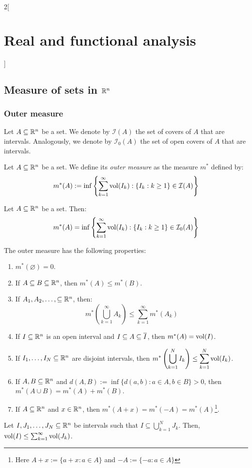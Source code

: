 \documentclass[../../../main.tex]{subfiles}
\begin{document}
\begin{multicols}{2}[\section{Real and functional analysis}]
  \subsection{Measure of sets in \texorpdfstring{$\mathbb{R}^n$}{Rn}}
  \subsubsection{Outer measure}
  \begin{definition}
    Let $A\subseteq\mathbb{R}^n$ be a set. We denote by $\mathcal{I}(A)$ the set of covers of $A$ that are intervals. Analogously, we denote by $\mathcal{I}_0(A)$ the set of open covers of $A$ that are intervals.
  \end{definition}
  \begin{definition}
    Let $A\subseteq\mathbb{R}^n$ be a set. We define its \emph{outer measure} as the measure $m^*$ defined by:
    $$m^*(A):=\inf\left\{\sum_{k= 1}^\infty \operatorname{vol}(I_k):\{I_k:k\geq 1\}\in \mathcal{I}(A)\right\}$$
  \end{definition}
  \begin{proposition}
    Let $A\subseteq\mathbb{R}^n$ be a set. Then:
    $$m^*(A)=\inf\left\{\sum_{k= 1}^\infty \operatorname{vol}(I_k):\{I_k:k\geq 1\}\in \mathcal{I}_0(A)\right\}$$
  \end{proposition}
  \begin{theorem}
    The outer measure has the following properties:
    \begin{enumerate}
      \item $m^*(\varnothing)=0$.
      \item If $A\subseteq B\subseteq\mathbb{R}^n$, then $m^*(A)\leq m^*(B)$.
      \item If $A_1, A_2,\ldots, \subseteq \mathbb{R}^n$, then: $$ m^*\left(\bigcup_{k=1}^\infty A_k\right)\leq \sum_{k=1}^\infty m^*(A_k)$$
      \item If $I\subseteq \mathbb{R}^n$ is an open interval and $I\subseteq A\subseteq \overline{I}$, then $m^*(A)=\operatorname{vol}(I)$.
      \item If $I_1,\ldots,I_N\subseteq \mathbb{R}^n$ are disjoint intervals, then $\displaystyle m^*\left(\bigcup_{k=1}^N I_k\right)\leq \sum_{k=1}^N \operatorname{vol}(I_k)$.
      \item If $A,B\subseteq \mathbb{R}^n$ and $d(A,B):=\inf\{d(a,b):a\in A,b\in B\}>0$, then $m^*(A\cup B)=m^*(A)+m^*(B)$.
      \item If $A\subseteq\mathbb{R}^n$ and $x\in\mathbb{R}^n$, then $m^*(A+x)=m^*(-A)=m^*(A)$\footnote{Here $A+x:=\{a+x:a\in A\}$ and $-A:=\{-a:a\in A\}$}.
    \end{enumerate}
  \end{theorem}
  \begin{lemma}
    Let $I,J_1,\ldots,J_N\subseteq \mathbb{R}^n$ be intervals such that $I\subseteq \bigcup_{k=1}^N J_k$. Then, $\operatorname{vol}(I)\leq\sum_{k=1}^\infty \operatorname{vol}(J_k)$.
  \end{lemma}
\end{multicols}
\end{document}
